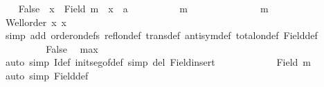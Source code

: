 \begin{isabellebody}
{}\isanewline
\ \ \isamarkupfalse%
\ False\ \ {\isachardoublequoteopen}x\ {\isasymnotin}\ Field\ m{\isachardoublequoteclose}\ \ x\ {\isacharcolon}{\kern0pt}{\isacharcolon}{\kern0pt}\ {\isacharprime}{\kern0pt}a\isanewline
\ \ \isamarkupfalse%
\ {\isacharminus}{\kern0pt}\isanewline
%
\isanewline
\ \ \ \ \isamarkupfalse%
\ {\isachardoublequoteopen}m\ {\isasymnoteq}\ {\isacharbraceleft}{\kern0pt}{\isacharbraceright}{\kern0pt}{\isachardoublequoteclose}\isanewline
\ \ \ \ \isamarkupfalse%
\isanewline
\ \ \ \ \ \ \isamarkupfalse%
\ {\isachardoublequoteopen}m\ {\isacharequal}{\kern0pt}\ {\isacharbraceleft}{\kern0pt}{\isacharbraceright}{\kern0pt}{\isachardoublequoteclose}\isanewline
\ \ \ \ \ \ \isamarkupfalse%
\ \isamarkupfalse%
\ {\isachardoublequoteopen}Well{\isacharunderscore}{\kern0pt}order\ {\isacharbraceleft}{\kern0pt}{\isacharparenleft}{\kern0pt}x{\isacharcomma}{\kern0pt}\ x{\isacharparenright}{\kern0pt}{\isacharbraceright}{\kern0pt}{\isachardoublequoteclose}\isanewline
\ \ \ \ \ \ \ \ \isamarkupfalse%
\ {\isacharparenleft}{\kern0pt}simp\ add{\isacharcolon}{\kern0pt}\ order{\isacharunderscore}{\kern0pt}on{\isacharunderscore}{\kern0pt}defs\ refl{\isacharunderscore}{\kern0pt}on{\isacharunderscore}{\kern0pt}def\ trans{\isacharunderscore}{\kern0pt}def\ antisym{\isacharunderscore}{\kern0pt}def\ total{\isacharunderscore}{\kern0pt}on{\isacharunderscore}{\kern0pt}def\ Field{\isacharunderscore}{\kern0pt}def{\isacharparenright}{\kern0pt}\isanewline
\ \ \ \ \ \ \isamarkupfalse%
\ \isamarkupfalse%
\ False\ \isamarkupfalse%
\ max\isanewline
\ \ \ \ \ \ \ \ \isamarkupfalse%
\ {\isacharparenleft}{\kern0pt}auto\ simp{\isacharcolon}{\kern0pt}\ I{\isacharunderscore}{\kern0pt}def\ init{\isacharunderscore}{\kern0pt}seg{\isacharunderscore}{\kern0pt}of{\isacharunderscore}{\kern0pt}def\ simp\ del{\isacharcolon}{\kern0pt}\ Field{\isacharunderscore}{\kern0pt}insert{\isacharparenright}{\kern0pt}\isanewline
\ \ \ \ \isamarkupfalse%
\isanewline
\ \ \ \ \isamarkupfalse%
\ \isamarkupfalse%
\ {\isachardoublequoteopen}Field\ m\ {\isasymnoteq}\ {\isacharbraceleft}{\kern0pt}{\isacharbraceright}{\kern0pt}{\isachardoublequoteclose}\ \isamarkupfalse%
\ {\isacharparenleft}{\kern0pt}auto\ simp{\isacharcolon}{\kern0pt}\ Field{\isacharunderscore}{\kern0pt}def{\isacharparenright}{\kern0pt}\isanewline

\end{isabellebody}
